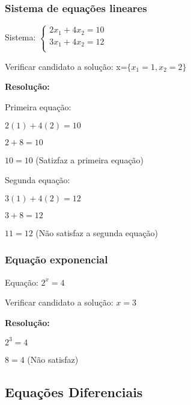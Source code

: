 \documentclass[a4paper]{article}
\providecommand{\sin}{} \renewcommand{\sin}{\hspace{2pt}\mathrm{sen}}
\begin{document}
\subsubsection{Sistema de equações lineares}

Sistema: $
\left\{ \begin{array}{c}
    2x_1 + 4x_2 = 10\\
    3x_1 + 4x_2 = 12\\
  \end{array}
\right.$

Verificar candidato a solução: x=$\{x_1= 1, x_2=2\}$

{\bf Resolução:}

\begin{multicols}{2}
Primeira equação:

$2(1) +4(2)=10$

$2+8=10$

$10=10$ (Satizfaz a primeira equação)

\columnbreak
Segunda equação:

$3(1)+4(2)=12$

$3+8=12$

$11=12$ (Não satisfaz a segunda equação)

\end{multicols}


\subsubsection{Equação exponencial}

Equação: $2^x = 4$

Verificar candidato a solução: $x=3$

{\bf Resolução:}

$2^3 = 4$

$8=4$ (Não satisfaz)




\subsection{Equações Diferenciais}
\end{document}
